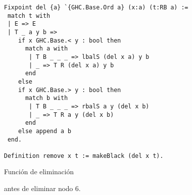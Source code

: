 \begin{figure}
\centering
\captionsetup{justification=centering}
\begin{verbatim}
Fixpoint del {a} `{GHC.Base.Ord a} (x:a) (t:RB a) :=
 match t with
 | E => E
 | T _ a y b =>
    if x GHC.Base.< y : bool then
      match a with
       | T B _ _ _ => lbalS (del x a) y b
       | _ => T R (del x a) y b
      end
    else
    if x GHC.Base.> y : bool then
      match b with
       | T B _ _ _ => rbalS a y (del x b)
       | _ => T R a y (del x b)
      end
    else append a b
 end.

Definition remove x t := makeBlack (del x t).
\end{verbatim}
\caption{Función de eliminación}
\label{func_del}
\end{figure}

\begin{figure}
\centering
\captionsetup{justification=centering}
\caption{{\Arn antes de eliminar nodo 6.}}
\label{arbolRB_4}
\end{figure}

